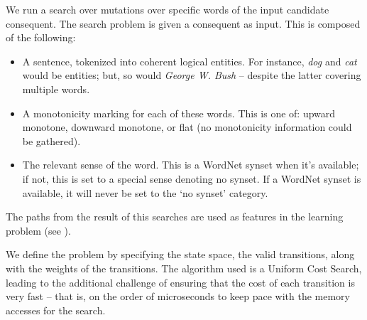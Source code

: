 We run a search over mutations over specific words of the input candidate
  consequent.
The search problem is given a consequent as input.
This is composed of the following:

\begin{itemize}
  \item A sentence, tokenized into coherent logical entities.
        For instance, \textit{dog} and \textit{cat} would be entities;
          but, so would \textit{George W. Bush} -- despite the latter covering
          multiple words.
  \item A monotonicity marking for each of these words.
        This is one of: upward monotone, downward monotone, or flat (no
          monotonicity information could be gathered).
  \item The relevant sense of the word.
        This is a WordNet synset when it's available; if not, this is
          set to a special sense denoting no synset.
        If a WordNet synset is available, it will never be set to the
          `no synset' category.
\end{itemize}

The paths from the result of this searches are used
  as features in the learning problem
  (see ).

We define the problem by specifying the state space,
  the valid transitions, along with the weights of
  the transitions.
The algorithm used is a Uniform Cost Search, leading
  to the additional challenge of ensuring that the
  cost of each transition is very fast -- that is,
  on the order of microseconds to keep pace with
  the memory accesses for the search.

%

